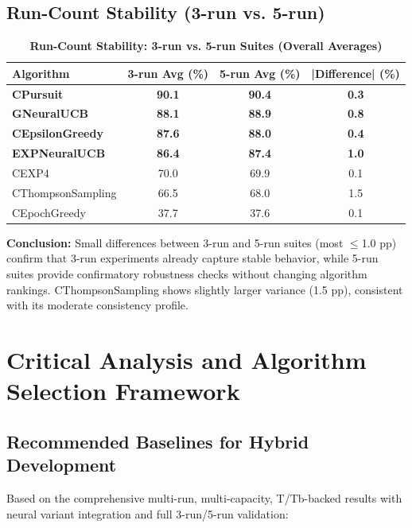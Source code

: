 \documentclass[12pt,a4paper]{article}
\newcommand{\success}[1]{\textcolor{successcolor}{\textbf{#1}}}
\newcommand{\legacy}[1]{\textcolor{legacycolor}{\textbf{#1}}}
\newcommand{\neural}[1]{\textcolor{neuralcolor}{\textbf{#1}}}
\begin{document}
\subsection{Run-Count Stability (3-run vs. 5-run)}

\begin{table}[H]
\centering
\caption{\success{Run-Count Stability: 3-run vs. 5-run Suites (Overall Averages)}}
\begin{tabular}{|l|c|c|c|}
\hline
\textbf{Algorithm} & \textbf{3-run Avg (\%)} & \textbf{5-run Avg (\%)} & \textbf{|Difference| (\%)} \\
\hline
\hline
\success{CPursuit}        & \success{90.1} & \success{90.4} & \success{0.3} \\
\neural{GNeuralUCB}       & \neural{88.1} & \neural{88.9} & \neural{0.8} \\
\success{CEpsilonGreedy} & \success{87.6} & \success{88.0} & \success{0.4} \\
\legacy{EXPNeuralUCB}    & \legacy{86.4} & \legacy{87.4} & \legacy{1.0} \\
CEXP4                    & 70.0          & 69.9          & 0.1 \\
CThompsonSampling        & 66.5          & 68.0          & 1.5 \\
CEpochGreedy             & 37.7          & 37.6          & 0.1 \\
\hline
\end{tabular}
\end{table}

\textbf{Conclusion:} Small differences between 3-run and 5-run suites (most $\leq$1.0 pp) confirm that 3-run experiments already capture stable behavior, while 5-run suites provide confirmatory robustness checks without changing algorithm rankings. CThompsonSampling shows slightly larger variance (1.5 pp), consistent with its moderate consistency profile.

\section{Critical Analysis and Algorithm Selection Framework}

\subsection{Recommended Baselines for Hybrid Development}

Based on the comprehensive multi-run, multi-capacity, T/Tb-backed results with neural variant integration and full 3-run/5-run validation:
\end{document}
